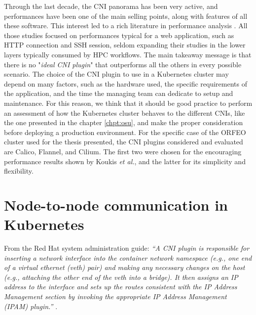Through the last decade, the CNI panorama has been very active, and performances
have been one of the main selling points, along with features of all these
software.
This interest led to a rich literature in performance analysis
\cite{Kapoius2020,Kang2021,Qi2021,Koukis2024}.
All those studies focused on performances typical for a web application, such as
HTTP connection and SSH session, seldom expanding their studies in the lower
layers typically consumed by HPC workflows.
The main takeaway message is that there is no "\textit{ideal CNI plugin}" that
outperforms all the others in every possible scenario.
The choice of the CNI plugin to use in a Kubernetes cluster may depend on many
factors, such as the hardware used, the specific requirements of the
application, and the time the managing team can dedicate to setup and
maintenance.
For this reason, we think that it should be good practice to perform an
assessment of how the Kubernetes cluster behaves to the different CNIs, like the
one presented in the chapter \ref{chpt:osu}, and make the proper consideration
before deploying a production environment.
For the specific case of the ORFEO cluster used for the thesis presented, the
CNI plugins considered and evaluated are Calico, Flannel, and Cilium.
The first two were chosen for the encouraging performance results shown by
Koukis \emph{et al.}\cite{Koukis2024}, and the latter for its simplicity and
flexibility.

\section{Node-to-node communication in Kubernetes}\label{sec:node2node}

From the Red Hat system administration guide:
\textit{``A CNI plugin is responsible for inserting a network interface into the
    container network namespace (e.g., one end of a virtual ethernet (veth)
    pair) and making any necessary changes on the host (e.g., attaching the
    other end of the veth into a bridge). It then assigns an IP address to the
    interface and sets up the routes consistent with the IP Address Management
    section by invoking the appropriate IP Address Management (IPAM) plugin.''
} \cite{redhat-cni}.


